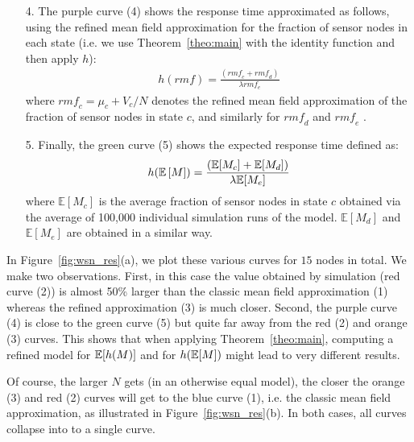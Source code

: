 \documentclass{elsarticle}
\begin{document}
\begin{itemize}
\item[4.] The purple curve (4) shows the response time approximated as
  follows, using the refined mean field approximation for the fraction
  of sensor nodes in each state (i.e. we use Theorem~\ref{theo:main}
  with the identity function and then apply $h$):
  \begin{align*}
    h(\mathit{rmf}) = \frac{(\mathit{rmf\!}_c + \mathit{rmf\!}_d)}{\lambda
    \mathit{rmf\!}_e}
  \end{align*}
  where $\mathit{rmf\!}_c=\mu_c+V_c/N$ denotes the refined mean field
  approximation of the fraction of sensor nodes in state $c$, and
  similarly for $\mathit{rmf\!}_d$ and $\mathit{rmf\!}_e$ .
\item[5.] Finally, the green curve (5) shows the expected response time
  defined as:
  \begin{align*}
    h(\esp{M}) = \frac{(\mathbb{E}[M_c] + \mathbb{E}[M_d])}{\lambda
    \mathbb{E}[M_e]}
  \end{align*}
  where $\mathbb{E}[M_c]$ is the average fraction of sensor nodes in
  state $c$ obtained via the average of 100,000 individual simulation
  runs of the model. $\mathbb{E}[M_d]$ and $\mathbb{E}[M_e]$ are obtained in a
  similar way.
\end{itemize}
In Figure~\ref{fig:wsn_res}(a), we plot these various curves for $15$
nodes in total. We make two observations. First, in this case the
value obtained by simulation (red curve (2)) is almost 50\% larger
than the classic mean field approximation (1) whereas the refined
approximation (3) is much closer. Second, the purple curve (4) is
close to the green curve (5) but quite far away from the red (2) and
orange (3) curves. This shows that when applying
Theorem~\ref{theo:main}, computing a refined model for $\esp{h(M)}$
and for $h(\esp{M})$ might lead to very different results.

Of course, the larger $N$ gets (in an otherwise equal model), the
closer the orange (3) and red (2) curves will get to the blue curve (1),
i.e. the classic mean field approximation, as illustrated in
Figure~\ref{fig:wsn_res}(b). In both cases, all curves collapse
into to a single curve. 
\end{document}
